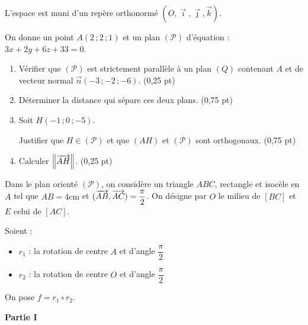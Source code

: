 

L'espace est muni d'un repère orthonormé $(O,\vec{\imath},\vec{\jmath},\vec{k})$.

On donne un point $A(2\,;2\,;1)$ et un plan $(\mathscr{P})$ d'équation : $3x + 2y + 6z + 33 = 0$.

\begin{enumerate}
	\item Vérifier que $(\mathscr{P})$ est strictement parallèle à un plan $(Q)$ contenant $A$ et de vecteur normal $\vec{n}(-3\,;-2\,;-6)$. \hfill (0,25 pt)
	\item Déterminer la distance qui sépare ces deux plans. \hfill (0,75 pt)
	\item Soit $H(-1\,;0\,;-5)$.

	Justifier que $H \in (\mathscr{P})$ et que $(AH)$ et $(\mathscr{P})$ sont orthogonaux. \hfill (0,75 pt)
	\item Calculer $\left\Vert \overrightarrow{AH} \right\Vert$. \hfill (0,25 pt)
\end{enumerate}




Dans le plan orienté $(\mathscr{P})$, on considère un triangle $ABC$, rectangle et isocèle en $A$ tel que $AB = 4\text{cm}$ et $(\overrightarrow{AB},\overrightarrow{AC}) = \dfrac{\pi}{2}$. On désigne par $O$ le milieu de $[BC]$ et $E$ celui de $[AC]$.

Soient :
\begin{itemize}[label=\textbullet]
	\item $r_1$ : la rotation de centre $A$ et d'angle $\dfrac{\pi}{2}$
	\item $r_2$ : la rotation de centre $O$ et d'angle $\dfrac{\pi}{2}$
\end{itemize}
On pose $f = r_1 \circ r_2$.

\medskip
\noindent\textbf{Partie I}

